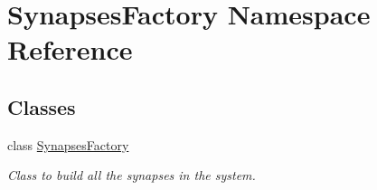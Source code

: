 \hypertarget{namespace_synapses_factory}{\section{Synapses\-Factory Namespace Reference}
\label{namespace_synapses_factory}
}
\subsection*{Classes}
\begin{DoxyCompactItemize}
\item 
class \hyperlink{class_synapses_factory_1_1_synapses_factory}{Synapses\-Factory}
\begin{DoxyCompactList}\small\item\em Class to build all the synapses in the system. \end{DoxyCompactList}\end{DoxyCompactItemize}
